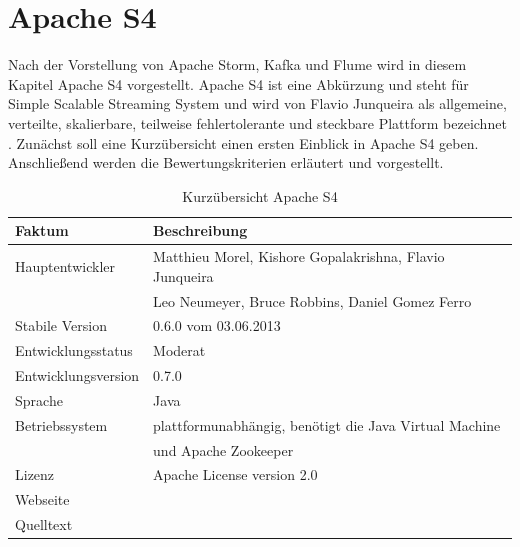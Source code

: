 \section{Apache S4}


Nach der Vorstellung von Apache Storm, Kafka und Flume wird in diesem Kapitel Apache S4 vorgestellt. Apache S4 ist eine Abkürzung und steht für Simple Scalable Streaming System und wird von Flavio Junqueira als allgemeine, verteilte, skalierbare, teilweise fehlertolerante und steckbare Plattform bezeichnet . Zunächst soll eine Kurzübersicht einen ersten Einblick in Apache S4 geben. Anschließend werden die Bewertungskriterien erläutert und vorgestellt.

\begin{table}[tbp]
	\centering
		\begin{tabular}{@{}ll@{}} \toprule
			\textbf{Faktum} & \textbf{Beschreibung} \\ \midrule
			Hauptentwickler & Matthieu Morel, Kishore Gopalakrishna, Flavio Junqueira \\
			& Leo Neumeyer, Bruce Robbins, Daniel Gomez Ferro \\
			Stabile Version & 0.6.0 vom 03.06.2013 \\ 
			Entwicklungsstatus &  Moderat \\
			Entwicklungsversion & 0.7.0 \\
			Sprache & Java \\
			Betriebssystem & plattformunabhängig, benötigt die Java Virtual Machine \\
			& und Apache Zookeeper \\
			Lizenz & Apache License version 2.0 \\
			Webseite & \citeint{s4:home} \\
			Quelltext & \citeint{s4:GitHubApacheMirror} \\			
			\bottomrule			
		\end{tabular}
	\caption{Kurzübersicht Apache S4}
	\label{tab:vors4}
\end{table}


